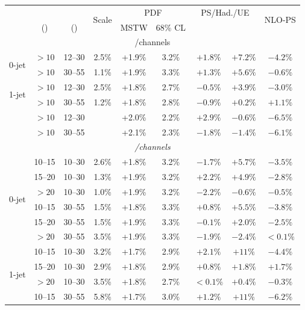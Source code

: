 \begin{table}
	\centering
	\begin{tabular}{ccc|cccccc}
		& \ptsubleadlep & \mll & \multirow{2}{*}{Scale} & \multicolumn{2}{c}{PDF} & \multicolumn{2}{c}{PS/Had./UE} & \multirow{2}{*}{NLO-PS} \\
		& (\GeV) & (\GeV) & & MSTW & 68\% CL & \pythia{6} & \fherwig & \\
		\hline
		\multicolumn{9}{c}{\ee/\mm channels} \\
		\hline
		\multirow{2}{*}{0-jet}
		&  $>10$ & 12--30 & 2.5\% & +1.9\% & 3.2\% & $+1.8\%$ & $+7.2\%$ & $-4.2\%$ \\
		&  $>10$ & 30--55 & 1.1\% & +1.9\% & 3.3\% & $+1.3\%$ & $+5.6\%$ & $-0.6\%$ \\
		\hline
		\multirow{2}{*}{1-jet}
		&  $>10$ & 12--30 & 2.5\% & +1.8\% & 2.7\% & $-0.5\%$ & $+3.9\%$ & $-3.0\%$ \\
		&  $>10$ & 30--55 & 1.2\% & +1.8\% & 2.8\% & $-0.9\%$ & $+0.2\%$ & $+1.1\%$ \\
		\hline
		\multirow{2}{*}{\twojet}
		&  $>10$ & 12--30 &       & +2.0\% & 2.2\% & $+2.9\%$ & $-0.6\%$ & $-6.5\%$ \\
		&  $>10$ & 30--55 &       & +2.1\% & 2.3\% & $-1.8\%$ & $-1.4\%$ & $-6.1\%$ \\
		\hline
		\multicolumn{9}{c}{\em/\me channels} \\
		\hline
		\multirow{6}{*}{0-jet}
	    & 10--15 & 10--30 & 2.6\% & +1.8\% & 3.2\% & $-1.7\%$ & $+5.7\%$ & $-3.5\%$ \\
		& 15--20 & 10--30 & 1.3\% & +1.9\% & 3.2\% & $+2.2\%$ & $+4.9\%$ & $-2.8\%$ \\
		&  $>20$ & 10--30 & 1.0\% & +1.9\% & 3.2\% & $-2.2\%$ & $-0.6\%$ & $-0.5\%$ \\
		& 10--15 & 30--55 & 1.5\% & +1.8\% & 3.3\% & $+0.8\%$ & $+5.5\%$ & $-3.8\%$ \\
		& 15--20 & 30--55 & 1.5\% & +1.9\% & 3.3\% & $-0.1\%$ & $+2.0\%$ & $-2.5\%$ \\
		&  $>20$ & 30--55 & 3.5\% & +1.9\% & 3.3\% & $-1.9\%$ & $-2.4\%$ & $<0.1\%$ \\
		\hline
		\multirow{6}{*}{1-jet}
	    & 10--15 & 10--30 & 3.2\% & +1.7\% & 2.9\% & $+2.1\%$ & $+11\%$  & $-4.4\%$ \\
		& 15--20 & 10--30 & 2.9\% & +1.8\% & 2.9\% & $+0.8\%$ & $+1.8\%$ & $+1.7\%$ \\
		&  $>20$ & 10--30 & 3.5\% & +1.8\% & 2.7\% & $<0.1\%$ & $+0.4\%$ & $-0.3\%$ \\
		& 10--15 & 30--55 & 5.8\% & +1.7\% & 3.0\% & $+1.2\%$ & $+11\%$  & $-6.2\%$ \\

\end{tabular}
\end{table}
